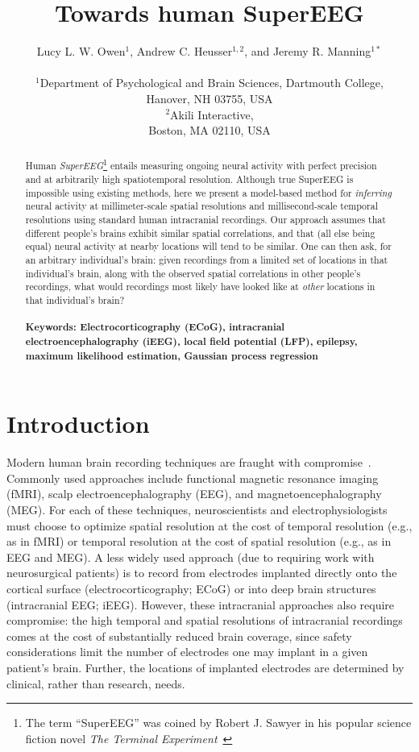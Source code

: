 \documentclass[11pt]{article}
\title{Towards human SuperEEG}
\author
{Lucy L. W. Owen$^{1}$, Andrew C. Heusser$^{1, 2}$, and Jeremy R. Manning$^{1\ast}$\\\\
$^{1}$Department of Psychological and Brain Sciences, Dartmouth College,\\
Hanover, NH 03755, USA\\
$^{2}$Akili Interactive,\\
Boston, MA 02110, USA}
\date{}
\begin{document}
 


\baselineskip24pt


\maketitle 

\begin{abstract}
  Human \textit{SuperEEG}\footnote{The term ``SuperEEG'' was coined by
    Robert J. Sawyer in his popular science fiction novel \textit{The
      Terminal Experiment}~\cite{Sawy95}} entails measuring ongoing
  neural activity with perfect precision and at arbitrarily high
  spatiotemporal resolution.  Although true SuperEEG is impossible
  using existing methods, here we present a model-based method for
  \textit{inferring} neural activity at millimeter-scale spatial
  resolutions and millisecond-scale temporal resolutions using
  standard human intracranial recordings.  Our approach assumes that
  different people's brains exhibit similar spatial correlations, and
  that (all else being equal) neural activity at nearby locations will
  tend to be similar.  One can then ask, for an arbitrary individual's
  brain: given recordings from a limited set of locations in that
  individual's brain, along with the observed spatial correlations in
  other people's recordings, what would recordings most likely have
  looked like at \textit{other} locations in that individual's
  brain?\\\\
  \footnotesize{\textbf{Keywords: Electrocorticography (ECoG),
      intracranial electroencephalography (iEEG), local field
      potential (LFP), epilepsy, maximum likelihood estimation,
      Gaussian process regression}}
\end{abstract}

\section*{Introduction}
Modern human brain recording techniques are fraught with
compromise~\citep{SejnEtal14}.  Commonly used approaches include
functional magnetic resonance imaging (fMRI), scalp
electroencephalography (EEG), and magnetoencephalography (MEG).  For
each of these techniques, neuroscientists and electrophysiologists
must choose to optimize spatial resolution at the cost of temporal
resolution (e.g., as in fMRI) or temporal resolution at the cost of
spatial resolution (e.g., as in EEG and MEG).  A less widely used
approach (due to requiring work with neurosurgical patients) is to
record from electrodes implanted directly onto the cortical surface
(electrocorticography; ECoG) or into deep brain structures
(intracranial EEG; iEEG).  However, these intracranial approaches also
require compromise: the high temporal and spatial resolutions of
intracranial recordings comes at the cost of substantially reduced
brain coverage, since safety considerations limit the number of
electrodes one may implant in a given patient's brain.  Further, the
locations of implanted electrodes are determined by clinical, rather
than research, needs.
\end{document}

